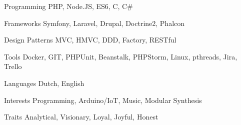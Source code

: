 

\begin{cvskills}

  \cvskill
    {Programming} %
    {PHP, Node.JS, ES6, C, C\#} %

  \cvskill
    {Frameworks} %
    {Symfony, Laravel, Drupal, Doctrine2, Phalcon} %
    
  \cvskill
    {Design Patterns} %
    {MVC, HMVC, DDD, Factory, RESTful} %

  \cvskill
    {Tools} %
    {Docker, GIT, PHPUnit, Beanstalk, PHPStorm, Linux, pthreads, Jira, Trello} %

  \cvskill
    {Languages} %
    {Dutch, English} %

  \cvskill
    {Interests} %
    {Programming, Arduino/IoT, Music, Modular Synthesis} %

  \cvskill
    {Traits} %
    {Analytical, Visionary, Loyal, Joyful, Honest} %
\end{cvskills}
